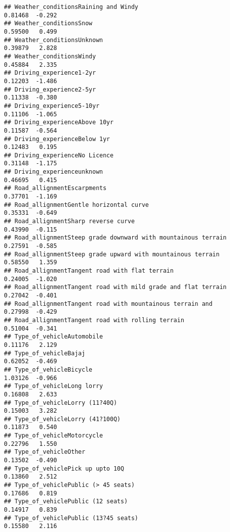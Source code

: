 \documentclass[
]{article}
\begin{document}
\begin{verbatim}
## Weather_conditionsRaining and Windy                             0.81468  -0.292
## Weather_conditionsSnow                                          0.59500   0.499
## Weather_conditionsUnknown                                       0.39879   2.828
## Weather_conditionsWindy                                         0.45884   2.335
## Driving_experience1-2yr                                         0.12203  -1.486
## Driving_experience2-5yr                                         0.11338  -0.380
## Driving_experience5-10yr                                        0.11106  -1.065
## Driving_experienceAbove 10yr                                    0.11587  -0.564
## Driving_experienceBelow 1yr                                     0.12483   0.195
## Driving_experienceNo Licence                                    0.31148  -1.175
## Driving_experienceunknown                                       0.46695   0.415
## Road_allignmentEscarpments                                      0.37701  -1.169
## Road_allignmentGentle horizontal curve                          0.35331  -0.649
## Road_allignmentSharp reverse curve                              0.43990  -0.115
## Road_allignmentSteep grade downward with mountainous terrain    0.27591  -0.585
## Road_allignmentSteep grade upward with mountainous terrain      0.58550   1.359
## Road_allignmentTangent road with flat terrain                   0.24005  -1.020
## Road_allignmentTangent road with mild grade and flat terrain    0.27042  -0.401
## Road_allignmentTangent road with mountainous terrain and        0.27998  -0.429
## Road_allignmentTangent road with rolling terrain                0.51004  -0.341
## Type_of_vehicleAutomobile                                       0.11176   2.129
## Type_of_vehicleBajaj                                            0.62052  -0.469
## Type_of_vehicleBicycle                                          1.03126  -0.966
## Type_of_vehicleLong lorry                                       0.16808   2.633
## Type_of_vehicleLorry (11?40Q)                                   0.15003   3.282
## Type_of_vehicleLorry (41?100Q)                                  0.11873   0.540
## Type_of_vehicleMotorcycle                                       0.22796   1.550
## Type_of_vehicleOther                                            0.13502  -0.490
## Type_of_vehiclePick up upto 10Q                                 0.13860   2.512
## Type_of_vehiclePublic (> 45 seats)                              0.17686   0.819
## Type_of_vehiclePublic (12 seats)                                0.14917   0.839
## Type_of_vehiclePublic (13?45 seats)                             0.15580   2.116

\end{verbatim}
\end{document}
